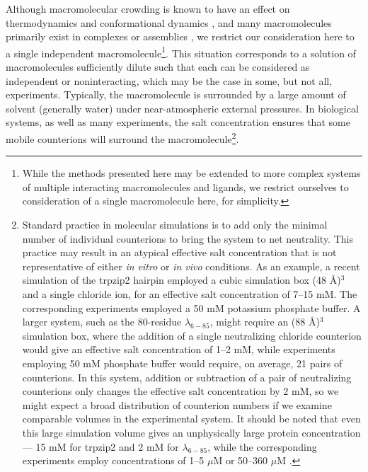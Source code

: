 Although macromolecular crowding is known to have an effect on thermodynamics and conformational dynamics \cite{elcock:pnas:2003:crowding,chebotareva:biochem-moscow:2004:crowding,zhou:j-mol-recognit:2004:crowding,zhou:jbc:2004:crowding,volker:annu-rev-biophys-biomol-struct:2005,minton:j-cell-sci:2006}, and many macromolecules primarily exist in complexes or assemblies \cite{sali:nature:2003}, we restrict our consideration here to a single independent macromolecule\footnote{While the methods presented here may be extended to more complex systems of multiple interacting macromolecules and ligands, we restrict ourselves to consideration of a single macromolecule here, for simplicity.}. 
This situation corresponds to a solution of macromolecules sufficiently dilute such that each can be considered as independent or noninteracting, which may be the case in some, but not all, experiments.
Typically, the macromolecule is surrounded by a large amount of solvent (generally water) under near-atmospheric external pressures.
In biological systems, as well as many experiments, the salt concentration ensures that some mobile counterions will surround the macromolecule\footnote{Standard practice in molecular simulations is to add only the minimal number of individual counterions to bring the system to net neutrality.  This practice may result in an atypical effective salt concentration that is not representative of either \emph{in vitro} or \emph{in vivo} conditions.  As an example, a recent simulation of the trpzip2 hairpin \cite{pitera:2006a} employed a cubic simulation box (48 \AA)$^3$ and a single chloride ion, for an effective salt concentration of 7--15 mM.  The corresponding experiments \cite{yang:2004a} employed a 50 mM potassium phosphate buffer.  A larger system, such as the 80-residue $\lambda_{6-85}$, might require an (88 \AA)$^3$ simulation box, where the addition of a single neutralizing chloride counterion would give an effective salt concentration of 1--2 mM, while experiments employing 50 mM phosphate buffer \cite{gruebele:pnas:2005} would require, on average, 21 pairs of counterions. In this system, addition or subtraction of a pair of neutralizing counterions only changes the effective salt concentration by 2 mM, so we might expect a broad distribution of counterion numbers if we examine comparable volumes in the experimental system.  It should be noted that even this large simulation volume gives an unphysically large protein concentration --- 15 mM for trpzip2 and 2 mM for $\lambda_{6-85}$, while the corresponding experiments employ concentrations of 1--5 $\mu$M \cite{yang:2003a} or 50--360 $\mu$M \cite{gruebele:pnas:2005}.}.
